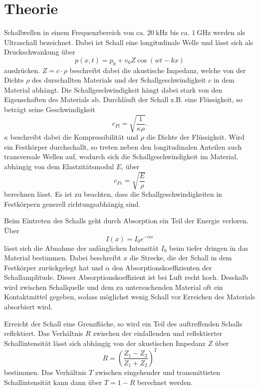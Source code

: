\section{Theorie}
\label{sec:Theorie}
Schallwellen in einem Frequenzbereich von ca. $\SI{20}{\kilo\hertz}$ bis ca. $\SI{1}{\giga\hertz}$ werden als Ultraschall bezeichnet. Dabei ist Schall eine longitudinale Welle und lässt sich als Druckschwankung über
\begin{equation}
 p(x,t)=p_0+v_0Z\cos(wt-kx)
\end{equation}
ausdrücken. $Z=c\cdot \rho$ beschreibt dabei die akustische Impedanz, welche von der Dichte $\rho$ des durschallten Materials und der Schallgeschwindigkeit $c$ in dem Material abhängt.
Die Schallgeschwindigkeit hängt dabei stark von den Eigenschaften des Materials ab. Durchläuft der Schall z.B. eine Flüssigkeit, so beträgt seine Geschwindigkeit
\begin{equation}
    c_{Fl}=\sqrt{\frac{1}{\kappa \rho}} .
\end{equation}
$\kappa$ beschreibt dabei die Kompressibilität und $\rho$ die Dichte der Flüssigkeit.
Wird ein Festkörper durchschallt, so treten neben den longitudinalen Anteilen auch transversale Wellen auf, wodurch sich die Schallgeschwindigkeit im Material, abhängig von dem Elastzitätsmodul $E$, über
\begin{equation}
    c_{Fe}=\sqrt{\frac{E}{\rho}}
\end{equation}
berechnen lässt.
Es ist zu beachten, dass die Schallgeschwindigkeiten in Festkörpern generell richtungsabhängig sind. 

Beim Eintreten des Schalls geht durch Absorption ein Teil der Energie verloren. Über 
\begin{equation}
    I(x)=I_0e^{-\alpha x}
    \label{eqn:abs}
\end{equation}
lässt sich die Abnahme der anfänglichen Intensität $I_0$ beim tiefer dringen in das Material bestimmen. Dabei beschreibt $x$ die Strecke, die der Schall in dem Festkörper zurückgelegt hat und $\alpha$ den Absorptionskoeffizienten der Schallamplitude. Dieser Absorptionskoeffizient ist bei Luft recht hoch. Desshalb wird zwischen Schallquelle und dem zu untersuchenden Material oft ein Kontaktmittel gegeben, sodass möglichst wenig Schall vor Erreichen des Materials absorbiert wird. 

Erreicht der Schall eine Grenzfläche, so wird ein Teil des auftreffenden Schalls reflektiert. Das Verhältnis $R$ zwischen der einfallenden und reflektierter Schallintensität lässt sich abhängig von der akustischen Impedanz $Z$ über
\begin{equation}
    R=\left(\frac{Z_1-Z_2}{Z_1+Z_2}\right)^2
\end{equation}
bestimmen. Das Verhältnis $T$ zwischen eingehender und transmittieten Schallintensität kann dann über $T=1-R$ berechnet werden.

